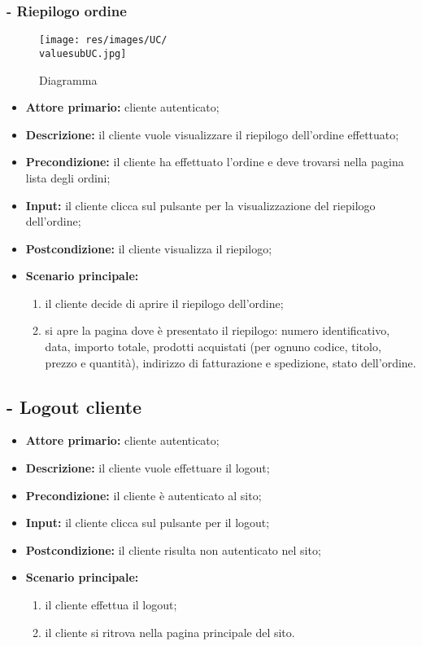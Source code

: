 \subsubsection{ - Riepilogo ordine}
\begin{figure}[H]
    \centering
    \texttt{[image: res/images/UC/\\valuesubUC.jpg]}
    \caption{Diagramma }
\end{figure}
\begin{itemize}
    \item \textbf{Attore primario:} cliente autenticato;
    \item \textbf{Descrizione:} il cliente vuole visualizzare il riepilogo dell'ordine effettuato;
    \item \textbf{Precondizione:} il cliente ha effettuato l'ordine e deve trovarsi nella pagina lista degli ordini;
    \item \textbf{Input:} il cliente clicca sul pulsante per la visualizzazione del riepilogo dell'ordine;
    \item \textbf{Postcondizione:} il cliente visualizza il riepilogo;
    \item \textbf{Scenario principale:}
          \begin{enumerate}
              \item il cliente decide di aprire il riepilogo dell'ordine;
              \item si apre la pagina dove è presentato il riepilogo: numero identificativo, data, importo totale, prodotti acquistati (per ognuno codice, titolo, prezzo e quantità), indirizzo di fatturazione e spedizione, stato dell'ordine.
          \end{enumerate}
\end{itemize}

\stepUserCase
\subsection{ - Logout cliente}
\begin{itemize}
    \item \textbf{Attore primario:} cliente autenticato;
    \item \textbf{Descrizione:} il cliente vuole effettuare il logout;
    \item \textbf{Precondizione:} il cliente è autenticato al sito;
    \item \textbf{Input:} il cliente clicca sul pulsante per il logout;
    \item \textbf{Postcondizione:} il cliente risulta non autenticato nel sito;
    \item \textbf{Scenario principale:}
          \begin{enumerate}
              \item il cliente effettua il logout;
              \item il cliente si ritrova nella pagina principale del sito.
          \end{enumerate}
\end{itemize}

